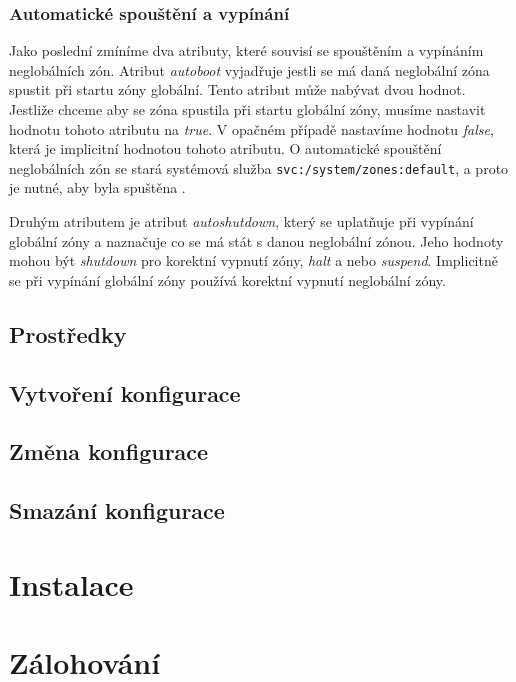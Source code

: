 \subsubsection{Automatické spouštění a vypínání}
\label{chapter:zones:configuration:global_attributes:autoboot}
Jako poslední zmíníme dva atributy, které souvisí se spouštěním a vypínáním neglobálních zón. Atribut \textit{autoboot} vyjadřuje
jestli se má daná neglobální zóna spustit při startu zóny globální. Tento atribut může nabývat dvou hodnot. Jestliže chceme
aby se zóna spustila při startu globální zóny, musíme nastavit hodnotu tohoto atributu na \textit{true}. V opačném případě
nastavíme hodnotu \textit{false}, která je implicitní hodnotou tohoto atributu. O automatické spouštění neglobálních zón se
stará systémová služba \verb|svc:/system/zones:default|, a proto je nutné, aby byla spuštěna \cite{oracle:manpages:zonecfg}.

Druhým atributem je atribut \textit{autoshutdown}, který se uplatňuje při vypínání globální zóny a naznačuje co se má stát
s danou neglobální zónou. Jeho hodnoty mohou být \textit{shutdown} pro korektní vypnutí zóny, \textit{halt} a nebo \textit{suspend}.
Implicitně se při vypínání globální zóny používá korektní vypnutí neglobální zóny.
\subsection{Prostředky}
\label{chapter:zones:configuration:resources}
\subsection{Vytvoření konfigurace}
\subsection{Změna konfigurace}
\subsection{Smazání konfigurace}

\section{Instalace}
\label{chapter:zones:instalation}
\section{Zálohování}
\label{chapter:zones:backup}